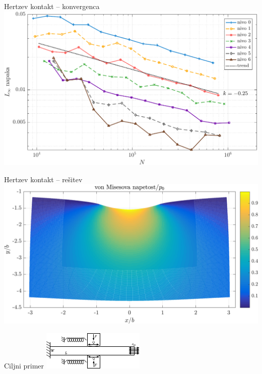 \begin{frame}{Hertzev kontakt -- konvergenca}
  \centering
  \vspace{3ex}
  \includegraphics[width=\textwidth]{resources/hertzian_refine_levels_convergence.pdf}
\end{frame}

\begin{frame}{Hertzev kontakt -- rešitev}
  \centering
  \vspace{3.5ex}
  \includegraphics[width=\textwidth]{resources/hertzian_solution_deformed_vm.png}
\end{frame}

\begin{frame}{Ciljni primer}
  \centering
  \vfill
  \includegraphics[width=\textwidth]{resources/fwo_shema.pdf}
  \vfill
\end{frame}

